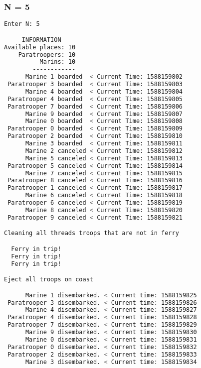 \documentclass{article}
\begin{document}
\subsubsection*{N = 5}
\begin{lstlisting}[language=BASH]
Enter N: 5

     INFORMATION
Available places: 10
    Paratroopers: 10
          Marins: 10
        ------------
      Marine 1 boarded  < Current Time: 1588159802 
 Paratrooper 3 boarded  < Current Time: 1588159803 
      Marine 4 boarded  < Current Time: 1588159804 
 Paratrooper 4 boarded  < Current Time: 1588159805 
 Paratrooper 7 boarded  < Current Time: 1588159806 
      Marine 9 boarded  < Current Time: 1588159807 
      Marine 0 boarded  < Current Time: 1588159808 
 Paratrooper 0 boarded  < Current Time: 1588159809 
 Paratrooper 2 boarded  < Current Time: 1588159810 
      Marine 3 boarded  < Current Time: 1588159811 
      Marine 2 canceled < Current Time: 1588159812 
      Marine 5 canceled < Current Time: 1588159813 
 Paratrooper 5 canceled < Current Time: 1588159814 
      Marine 7 canceled < Current Time: 1588159815 
 Paratrooper 8 canceled < Current Time: 1588159816 
 Paratrooper 1 canceled < Current Time: 1588159817 
      Marine 6 canceled < Current Time: 1588159818 
 Paratrooper 6 canceled < Current Time: 1588159819 
      Marine 8 canceled < Current Time: 1588159820 
 Paratrooper 9 canceled < Current Time: 1588159821 

Cleaning all threads troops that are not in ferry

  Ferry in trip!
  Ferry in trip!
  Ferry in trip!

Eject all troops on coast

      Marine 1 disembarked. < Current time: 1588159825
 Paratrooper 3 disembarked. < Current time: 1588159826
      Marine 4 disembarked. < Current time: 1588159827
 Paratrooper 4 disembarked. < Current time: 1588159828
 Paratrooper 7 disembarked. < Current time: 1588159829
      Marine 9 disembarked. < Current time: 1588159830
      Marine 0 disembarked. < Current time: 1588159831
 Paratrooper 0 disembarked. < Current time: 1588159832
 Paratrooper 2 disembarked. < Current time: 1588159833
      Marine 3 disembarked. < Current time: 1588159834

\end{lstlisting}
\begin{lstlisting}[language=BASH]
\end{lstlisting}
\begin{lstlisting}[language=BASH]
\end{lstlisting}
\end{document}
